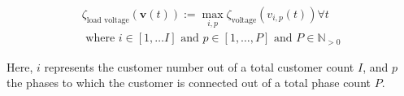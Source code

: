 \begin{equation}
\begin{split}
	\zeta_\text{load voltage}(\textbf{v}(t)) := \max_{i,p}{\zeta_\text{voltage}(v_{i,p}(t))} \forall t \\
	\text{ where } i \in [1, \dots I] \text{ and } p \in [1, \dots, P] \text{ and } P \in \mathbb{N}_{>0}
\end{split}
\label{ch1:equ:load-voltage-deviation}
\end{equation}

Here, $i$ represents the customer number out of a total customer count $I$, and $p$ the phases to which the customer is connected out of a total phase count $P$.